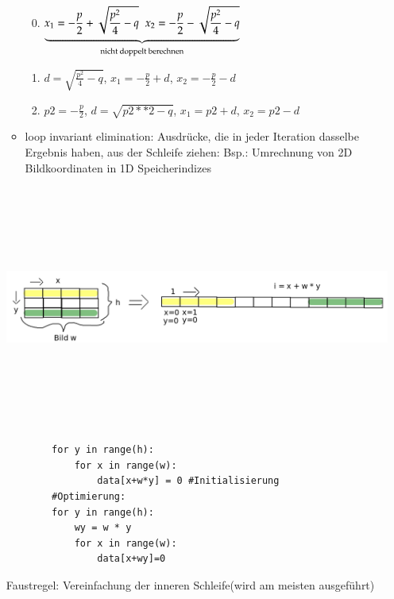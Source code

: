 \documentclass[11pt, fleqn]{scrreprt}
\begin{document}
\begin{itemize}
\begin{itemize}
            \begin{enumerate}
                \setcounter{enumi}{-1}
                \item $\underbrace{ x_1= -\frac{p}{2} + \sqrt{\frac{p^2}{4} - q}\hspace*{2mm}x_2= -\frac{p}{2} - \sqrt{\frac{p^2}{4} -q}}_{\text{nicht doppelt berechnen}}$
                \item $d = \sqrt{\frac{p^2}{4} - q}$,\hspace*{2mm} $x_1 = -\frac{p}{2} + d $,\hspace*{2mm} $x_2 =- \frac{p}{2} - d$
                \item $p2 = -\frac{p}{2}$, \hspace*{2mm}$d= \sqrt{p2**2-q}$,\hspace*{2mm} $x_1 = p2 + d$, \hspace*{2mm}$x_2 = p2 - d$
            \end{enumerate}
            \vspace*{2mm}
            \item \glqq loop invariant elimination\grqq : Ausdrücke, die in jeder Iteration dasselbe Ergebnis haben, aus der Schleife ziehen: Bsp.: Umrechnung von 2D Bildkoordinaten in 1D Speicherindizes
        \end{itemize}
        \includegraphics[width=15cm,height=8cm,keepaspectratio]{./Pictures/2D1D.png}
        \begin{verbatim}
        for y in range(h):
            for x in range(w):
                data[x+w*y] = 0 #Initialisierung
        #Optimierung:
        for y in range(h):
            wy = w * y
            for x in range(w):
                data[x+wy]=0
        \end{verbatim}
        Faustregel: \glqq Vereinfachung der inneren Schleife\grqq  (wird am meisten ausgeführt)\\

\end{itemize}
\end{document}
